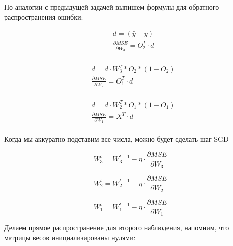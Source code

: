 \begin{sol}
По аналогии с предыдущей задачей выпишем формулы для обратного распространения ошибки:

\begin{minipage}{.2\linewidth}
	\begin{equation*} 
		\begin{aligned}
			&  d = (\hat{y} - y) \\
			&  \frac{\partial MSE}{\partial W_3} = O_2^T \cdot d  \\
		\end{aligned}
	\end{equation*}
\end{minipage} \hfill
\begin{minipage}{.35\linewidth}
	\begin{equation*} 
		\begin{aligned}
			&  d = d \cdot W_3^T * O_2 * (1 - O_2)  \\
			&  \frac{\partial MSE}{\partial W_2} = O_1^T \cdot d \\
		\end{aligned}
	\end{equation*}
\end{minipage} \hfill
\begin{minipage}{.35\linewidth}
	\begin{equation*} 
	\begin{aligned}
	&  d = d \cdot W_2^T * O_1 * (1 - O_1)  \\
	&  \frac{\partial MSE}{\partial W_1} = X^T \cdot d \\
	\end{aligned}
	\end{equation*}
\end{minipage}

Когда мы аккуратно подставим все числа, можно будет сделать шаг SGD

\begin{minipage}{.28\textwidth}
    \[  W_3^t = W_3^{t-1} - \eta \cdot \frac{\partial MSE}{\partial W_3}  \]
\end{minipage}
\begin{minipage}{.3\textwidth}
	\[  W_2^t = W_2^{t-1} - \eta \cdot \frac{\partial MSE}{\partial W_2}  \]
\end{minipage}
\begin{minipage}{.35\textwidth}
	\[  W_1^t = W_1^{t-1} - \eta \cdot \frac{\partial MSE}{\partial W_1}  \]
\end{minipage}

 Делаем прямое распространение для второго наблюдения, напомним, что матрицы весов инициализированы нулями:


\end{sol}
